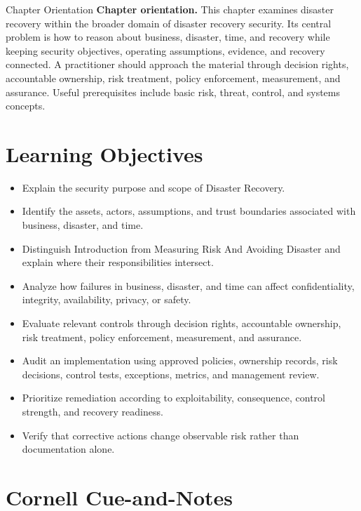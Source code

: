 \documentclass[11pt,letterpaper]{article}
\title{\CornellDocumentTitle}
\author{}
\date{}
\begin{document}
\maketitle
\begin{CornellOverviewBox}{Chapter Orientation}
\textbf{Chapter orientation.} This chapter examines disaster recovery within the broader domain of disaster recovery security. Its central problem is how to reason about business, disaster, time, and recovery while keeping security objectives, operating assumptions, evidence, and recovery connected. A practitioner should approach the material through decision rights, accountable ownership, risk treatment, policy enforcement, measurement, and assurance. Useful prerequisites include basic risk, threat, control, and systems concepts.
\end{CornellOverviewBox}
\section*{Learning Objectives}
\begin{itemize}
\item Explain the security purpose and scope of Disaster Recovery.
\item Identify the assets, actors, assumptions, and trust boundaries associated with business, disaster, and time.
\item Distinguish Introduction from Measuring Risk And Avoiding Disaster and explain where their responsibilities intersect.
\item Analyze how failures in business, disaster, and time can affect confidentiality, integrity, availability, privacy, or safety.
\item Evaluate relevant controls through decision rights, accountable ownership, risk treatment, policy enforcement, measurement, and assurance.
\item Audit an implementation using approved policies, ownership records, risk decisions, control tests, exceptions, metrics, and management review.
\item Prioritize remediation according to exploitability, consequence, control strength, and recovery readiness.
\item Verify that corrective actions change observable risk rather than documentation alone.
\end{itemize}
\section*{Cornell Cue-and-Notes}
\end{document}
